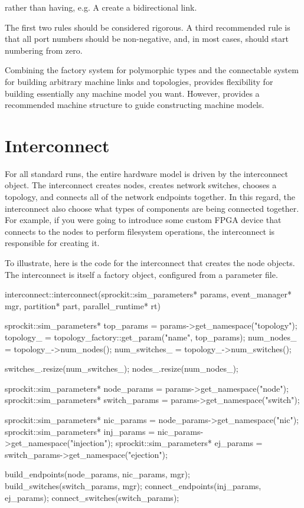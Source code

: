 rather than having, e.g. A create a bidirectional link.

The first two rules should be considered rigorous. 
A third recommended rule is that all port numbers should be non-negative, and, in most cases, should start numbering from zero.


Combining the factory system for polymorphic types and the connectable system for building arbitrary machine links and topologies,
\sstmacro provides flexibility for building essentially any machine model you want.
However, \sstmacro provides a recommended machine structure to guide constructing machine models.

\section{Interconnect}\label{sec:topInterconnect}
For all standard runs, the entire hardware model is driven by the interconnect object.
The interconnect creates nodes, creates network switches, chooses a topology, and connects all of the network endpoints together.
In this regard, the interconnect also choose what types of components are being connected together.
For example, if you were going to introduce some custom FPGA device that connects to the nodes to perform filesystem operations,
the interconnect is responsible for creating it.

To illustrate, here is the code for the interconnect that creates the node objects. 
The interconnect is itself a factory object, configured from a parameter file.

\begin{CppCode}
interconnect::interconnect(sprockit::sim_parameters* params, event_manager* mgr, 
	partition* part, parallel_runtime* rt)
{
  sprockit::sim_parameters* top_params = params->get_namespace("topology");
  topology_ = topology_factory::get_param("name", top_params);
  num_nodes_ = topology_->num_nodes();
  num_switches_ = topology_->num_switches();
  
  switches_.resize(num_switches_);
  nodes_.resize(num_nodes_);

  sprockit::sim_parameters* node_params = params->get_namespace("node");
  sprockit::sim_parameters* switch_params = params->get_namespace("switch");
  
  sprockit::sim_parameters* nic_params = node_params->get_namespace("nic");
  sprockit::sim_parameters* inj_params = nic_params->get_namespace("injection");
  sprockit::sim_parameters* ej_params = switch_params->get_namespace("ejection"); 
  
  build_endpoints(node_params, nic_params, mgr);
  build_switches(switch_params, mgr);
  connect_endpoints(inj_params, ej_params);
  connect_switches(switch_params); 
}
\end{CppCode}

